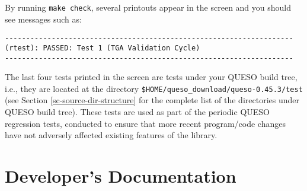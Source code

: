 % 
% 
% 
% 


By running \texttt{make check}, several printouts appear in the screen and you should see messages such as:
\begin{lstlisting}
--------------------------------------------------------------------
(rtest): PASSED: Test 1 (TGA Validation Cycle)
--------------------------------------------------------------------
\end{lstlisting}

The last four tests printed in  the screen are tests under your QUESO build tree, i.e., they are located at the  directory \verb+$HOME/queso_download/queso-0.45.3/test+ (see Section \ref{sc-source-dir-structure} for the complete list of the directories under QUESO build tree).      %
These tests are used as part of the periodic QUESO regression tests, conducted to ensure that more recent program/code changes have not adversely affected existing features of the library.



\section{\Queso{} Developer's Documentation}\label{sec:Queso_docs}



